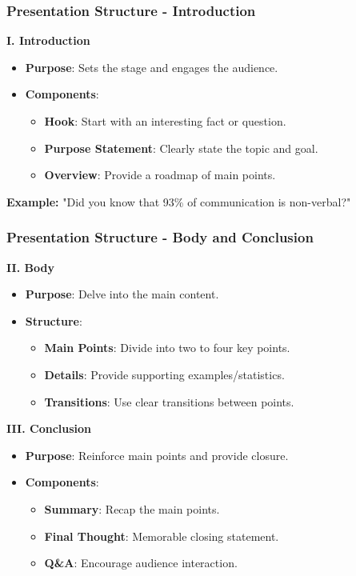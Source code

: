 \documentclass[aspectratio=169]{beamer}
\begin{document}
\begin{frame}[fragile]
    \frametitle{Presentation Structure - Introduction}
    \textbf{I. Introduction}

    \begin{itemize}
        \item \textbf{Purpose}: Sets the stage and engages the audience.
        \item \textbf{Components}:
        \begin{itemize}
            \item \textbf{Hook}: Start with an interesting fact or question.
            \item \textbf{Purpose Statement}: Clearly state the topic and goal.
            \item \textbf{Overview}: Provide a roadmap of main points.
        \end{itemize}
    \end{itemize}

    \textbf{Example:} "Did you know that 93\% of communication is non-verbal?"
\end{frame}

\begin{frame}[fragile]
    \frametitle{Presentation Structure - Body and Conclusion}
    \textbf{II. Body}

    \begin{itemize}
        \item \textbf{Purpose}: Delve into the main content.
        \item \textbf{Structure}:
        \begin{itemize}
            \item \textbf{Main Points}: Divide into two to four key points.
            \item \textbf{Details}: Provide supporting examples/statistics.
            \item \textbf{Transitions}: Use clear transitions between points.
        \end{itemize}
    \end{itemize}

    \textbf{III. Conclusion}

    \begin{itemize}
        \item \textbf{Purpose}: Reinforce main points and provide closure.
        \item \textbf{Components}:
        \begin{itemize}
            \item \textbf{Summary}: Recap the main points.
            \item \textbf{Final Thought}: Memorable closing statement.
            \item \textbf{Q\&A}: Encourage audience interaction.
        \end{itemize}
    \end{itemize}
\end{frame}
\end{document}
